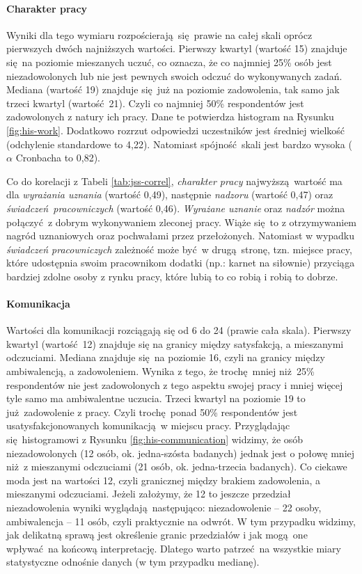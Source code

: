 \paragraph{Charakter pracy} Wyniki dla tego wymiaru rozpościerają się prawie na całej skali oprócz pierwszych dwóch najniższych wartości. Pierwszy kwartyl (wartość 15) znajduje się na poziomie mieszanych uczuć, co oznacza, że co najmniej 25\% osób jest niezadowolonych lub nie jest pewnych swoich odczuć do wykonywanych zadań. Mediana (wartość 19) znajduje się już na poziomie zadowolenia, tak samo jak trzeci kwartyl (wartość 21). Czyli co najmniej 50\% respondentów jest zadowolonych z
natury ich pracy. Dane te potwierdza histogram na Rysunku \ref{fig:his-work}. Dodatkowo rozrzut odpowiedzi uczestników jest średniej wielkość (odchylenie standardowe to 4,22). Natomiast spójność skali jest bardzo wysoka ($\alpha$ Cronbacha to 0,82).

Co do korelacji z Tabeli \ref{tab:jss-correl}, \textit{charakter pracy} najwyższą wartość ma dla \textit{wyrażania uznania} (wartość 0,49), następnie \textit{nadzoru} (wartość 0,47) oraz \textit{świadczeń pracowniczych} (wartość 0,46). \textit{Wyrażane uznanie} oraz \textit{nadzór} można połączyć z dobrym wykonywaniem zleconej pracy. Wiąże się to z otrzymywaniem nagród uznaniowych oraz pochwałami przez przełożonych. Natomiast w wypadku \textit{świadczeń pracowniczych} zależność może być w drugą stronę, tzn. miejsce pracy, które udostępnia swoim
pracownikom dodatki (np.: karnet na siłownie) przyciąga bardziej zdolne osoby z rynku pracy, które lubią to co robią i robią to dobrze.

\paragraph{Komunikacja} Wartości dla komunikacji rozciągają się od 6 do 24 (prawie cała skala). Pierwszy kwartyl (wartość 12) znajduje się na granicy między satysfakcją, a mieszanymi odczuciami. Mediana znajduje się na poziomie 16, czyli na granicy między ambiwalencją, a zadowoleniem. Wynika z tego, że trochę mniej niż 25\% respondentów nie jest zadowolonych z tego aspektu swojej pracy i mniej więcej tyle samo ma ambiwalentne uczucia. Trzeci kwartyl na poziomie 19 to
już zadowolenie z pracy. Czyli trochę ponad 50\% respondentów jest usatysfakcjonowanych komunikacją w miejscu pracy. Przyglądając się histogramowi z Rysunku \ref{fig:his-communication} widzimy, że osób niezadowolonych (12 osób, ok. jedna-szósta badanych) jednak jest o połowę mniej niż z mieszanymi odczuciami (21 osób, ok. jedna-trzecia badanych). Co ciekawe moda jest na wartości 12, czyli granicznej między brakiem zadowolenia, a mieszanymi odczuciami. Jeżeli założymy, że 12 to jeszcze przedział
niezadowolenia wyniki wyglądają następująco: niezadowolenie -- 22 osoby, ambiwalencja -- 11 osób, czyli praktycznie na odwrót. W tym przypadku widzimy, jak delikatną sprawą jest określenie granic przedziałów i jak mogą one wpływać na końcową interpretację. Dlatego warto patrzeć na wszystkie miary statystyczne odnośnie danych (w tym przypadku medianę). 

